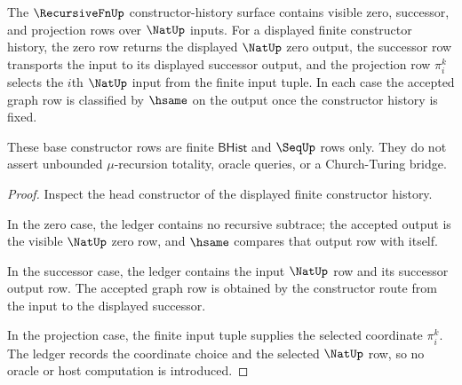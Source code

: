 \begin{theorem}
\label{thm:recursivefn-zero-successor-projection-obligation}
The $\RecursiveFnUp$ constructor-history surface contains visible zero,
successor, and projection rows over $\NatUp$ inputs. For a displayed finite
constructor history, the zero row returns the displayed $\NatUp$ zero output,
the successor row transports the input to its displayed successor output, and
the projection row $\pi^k_i$ selects the $i$th $\NatUp$ input from the finite
input tuple. In each case the accepted graph row is classified by $\hsame$ on
the output once the constructor history is fixed.

These base constructor rows are finite $\mathsf{BHist}$ and $\SeqUp$ rows only.
They do not assert unbounded $\mu$-recursion totality, oracle queries, or a
Church-Turing bridge.
\end{theorem}
\begin{proof}
Inspect the head constructor of the displayed finite constructor history.

In the zero case, the ledger contains no recursive subtrace; the accepted
output is the visible $\NatUp$ zero row, and $\hsame$ compares that output row
with itself.

In the successor case, the ledger contains the input $\NatUp$ row and its
successor output row. The accepted graph row is obtained by the constructor
route from the input to the displayed successor.

In the projection case, the finite input tuple supplies the selected coordinate
$\pi^k_i$. The ledger records the coordinate choice and the selected $\NatUp$
row, so no oracle or host computation is introduced.
\end{proof}

